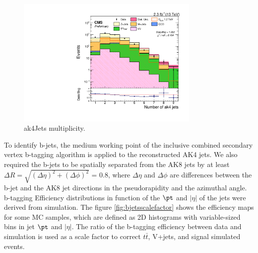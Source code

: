 \begin{figure}[!ht]
\caption{ak4Jets multiplicity.}
\begin{center}
  \includegraphics[width=250pt]{figuresCONDI/OBj/LOG_can_h_numjets.pdf}
\end{center}
\label{fig:ak4Multi}
\end{figure}

To identify b-jets, the medium working point of the inclusive combined secondary vertex b-tagging algorithm is applied to the reconstructed AK4 jets. We also required the b-jets to be spatially separated from the AK8 jets by at least $\Delta R = \sqrt{(\Delta \eta)^2+(\Delta \phi)^2}$ = 0.8, where $\Delta \eta$  and $\Delta \phi$ are differences between the b-jet and the AK8 jet directions in the pseudorapidity and the azimuthal angle. b-tagging Efficiency distributions in function of the  $\pt$ and $\left|\eta\right|$ of the jets were derived from simulation. The figure \ref{fig:bjetsscalefactor}  shows the efficiency maps for some MC samples, which are defined as 2D histograms with variable-sized bins in jet $\pt$ and $\left|\eta\right|$.
The ratio of the b-tagging efficiency between data and simulation is used as a scale factor to correct  $t\bar{t}$, V+jets, and signal simulated events.

